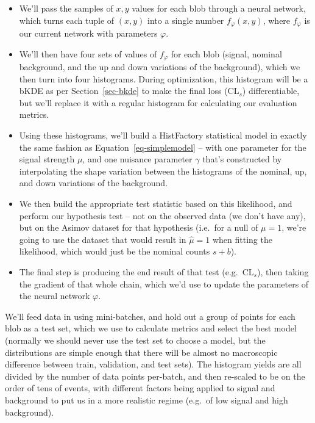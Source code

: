 \documentclass[
  11pt,
  numbers=noendperiod]{book}
\providecommand{\tightlist}{%
  \setlength{\itemsep}{0pt}\setlength{\parskip}{0pt}}\usepackage{longtable,booktabs,array}
\begin{document}
\begin{itemize}
\tightlist
\item
  We'll pass the samples of \(x, y\) values for each blob through a
  neural network, which turns each tuple of \((x, y)\) into a single
  number \(f_\varphi(x, y)\), where \(f_\varphi\) is our current network
  with parameters \(\varphi\).
\item
  We'll then have four sets of values of \(f_\varphi\) for each blob
  (signal, nominal background, and the up and down variations of the
  background), which we then turn into four histograms. During
  optimization, this histogram will be a bKDE as per
  Section~\ref{sec-bkde} to make the final loss (\(\mathrm{CL}_s\))
  differentiable, but we'll replace it with a regular histogram for
  calculating our evaluation metrics.
\item
  Using these histograms, we'll build a HistFactory statistical model in
  exactly the same fashion as Equation~\ref{eq-simplemodel} -- with one
  parameter for the signal strength \(\mu\), and one nuisance parameter
  \(\gamma\) that's constructed by interpolating the shape variation
  between the histograms of the nominal, up, and down variations of the
  background.
\item
  We then build the appropriate test statistic based on this likelihood,
  and perform our hypothesis test -- not on the observed data (we don't
  have any), but on the Asimov dataset for that hypothesis (i.e.~for a
  null of \(\mu=1\), we're going to use the dataset that would result in
  \(\hat{\mu} = 1\) when fitting the likelihood, which would just be the
  nominal counts \(s + b\)).
\item
  The final step is producing the end result of that test
  (e.g.~\(\mathrm{CL}_s\)), then taking the gradient of that whole
  chain, which we'd use to update the parameters of the neural network
  \(\varphi\).
\end{itemize}

We'll feed data in using mini-batches, and hold out a group of points
for each blob as a test set, which we use to calculate metrics and
select the best model (normally we should never use the test set to
choose a model, but the distributions are simple enough that there will
be almost no macroscopic difference between train, validation, and test
sets). The histogram yields are all divided by the number of data points
per-batch, and then re-scaled to be on the order of tens of events, with
different factors being applied to signal and background to put us in a
more realistic regime (e.g.~of low signal and high background).
\end{document}
